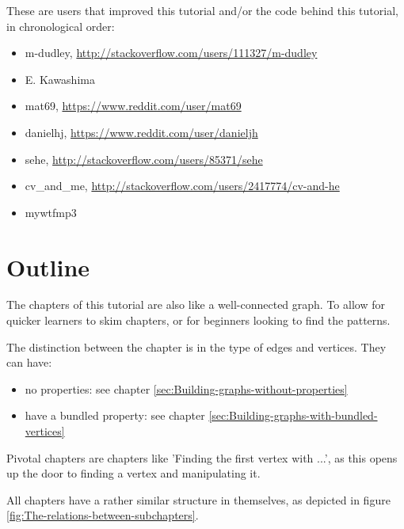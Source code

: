 These are users that improved this tutorial and/or the code behind this
tutorial, in chronological order:

\begin{itemize}
  \item m-dudley, \url{http://stackoverflow.com/users/111327/m-dudley}
  \item E. Kawashima
  \item mat69, \url{https://www.reddit.com/user/mat69}
  \item danielhj, \url{https://www.reddit.com/user/danieljh}
  \item sehe, \url{http://stackoverflow.com/users/85371/sehe}
  \item cv\_and\_me, \url{http://stackoverflow.com/users/2417774/cv-and-he}
  \item mywtfmp3
\end{itemize}

\section{Outline}

The chapters of this tutorial are also like a well-connected graph.
To allow for quicker learners to skim chapters, or for beginners looking
to find the patterns.

The distinction between the chapter is in the type of edges and vertices.
They can have:

\begin{itemize}
  \item no properties: 
    see chapter \ref{sec:Building-graphs-without-properties}
  \item have a bundled property: 
    see chapter \ref{sec:Building-graphs-with-bundled-vertices}
\end{itemize}

Pivotal chapters are chapters like 'Finding the first vertex with ...', as
this opens up the door to finding a vertex and manipulating it.

All chapters have a rather similar structure in themselves, as depicted
in figure \ref{fig:The-relations-between-subchapters}.

